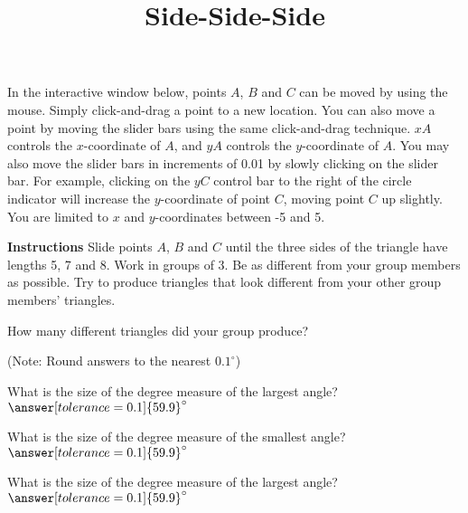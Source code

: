 \documentclass{ximera}
\title{Side-Side-Side}
\begin{document}
\begin{abstract}
\end{abstract}
\maketitle

In the interactive window below, points $A$, $B$ and $C$ can be moved by using the mouse. Simply click-and-drag a point to a new location. You can also move a point by moving the slider bars using the same click-and-drag technique. $xA$ controls the $x$-coordinate of $A$, and $yA$ controls the $y$-coordinate of $A$. You may also move the slider bars in increments of 0.01 by slowly clicking on the slider bar. For example, clicking on the $yC$ control bar to the right of the circle indicator will increase the $y$-coordinate of point $C$, moving point $C$ up slightly. You are limited to $x$ and $y$-coordinates between -5 and 5. 

{\bf {Instructions}} Slide points $A$, $B$ and $C$ until the three sides of the triangle have lengths 5, 7 and 8. Work in groups of 3. Be as different from your group members as possible. Try to produce triangles that look different from your other group members' triangles.



\begin{question}
How many different triangles did your group produce?
\begin{multipleChoice}
\end{multipleChoice}
\begin{question}
(Note: Round answers to the nearest $0.1^\circ$)

What is the size of the degree measure of the largest angle? $\answer[tolerance=0.1]{59.9}^\circ$

What is the size of the degree measure of the smallest angle? $\answer[tolerance=0.1]{59.9}^\circ$

What is the size of the degree measure of the largest angle? $\answer[tolerance=0.1]{59.9}^\circ$
\end{question}
\end{question}
\end{document}

